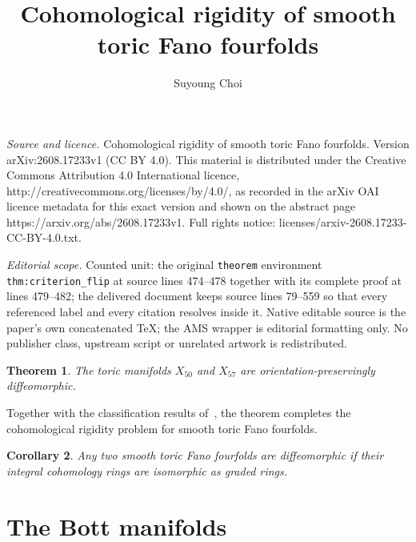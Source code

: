 \documentclass[10pt,a4paper]{amsart}
\newtheorem{theorem}{Theorem}[section]
\newtheorem{corollary}[theorem]{Corollary}
\numberwithin{equation}{section}
\begin{document}
\title[Cohomological rigidity of smooth toric Fano fourfolds]{Cohomological rigidity of smooth toric Fano fourfolds}
\author{Suyoung Choi}
\date{}
\maketitle
\noindent\emph{Source and licence.} Cohomological rigidity of smooth toric Fano fourfolds. Version arXiv:2608.17233v1 (CC BY 4.0). This material is distributed under the Creative Commons Attribution 4.0 International licence, http://creativecommons.org/licenses/by/4.0/, as recorded in the arXiv OAI licence metadata for this exact version and shown on the abstract page https://arxiv.org/abs/2608.17233v1. Full rights notice: licenses/arxiv-2608.17233-CC-BY-4.0.txt.\par\smallskip
\noindent\textit{Editorial scope.} Counted unit: the original \texttt{theorem} environment \texttt{thm:criterion\_flip} at source lines 474--478 together with its complete proof at lines 479--482; the delivered document keeps source lines 79--559 so that every referenced label and every citation resolves inside it. Native editable source is the paper's own concatenated TeX; the AMS wrapper is editorial formatting only. No publisher class, upstream script or unrelated artwork is redistributed.
\begin{theorem} \label{thm:main}
    The toric manifolds $X_{50}$ and $X_{57}$ are orientation-preservingly diffeomorphic.
\end{theorem}

Together with the classification results of~\cite{Higashitani-Kurimoto-Masuda2022}, the theorem completes the cohomological rigidity problem for smooth toric Fano fourfolds.

\begin{corollary}
    Any two smooth toric Fano fourfolds are diffeomorphic if their integral cohomology rings are isomorphic as graded rings.
\end{corollary}


\section{The Bott manifolds}\label{sec:fan-bott}
\end{document}
